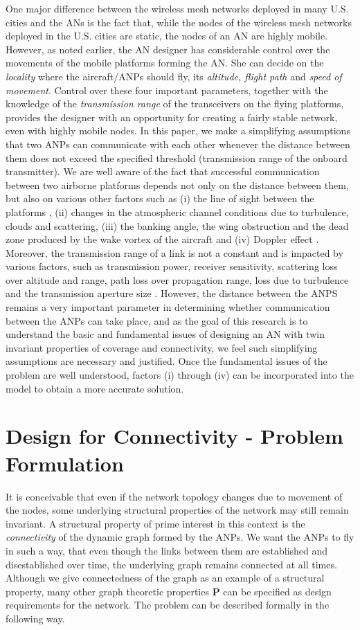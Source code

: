 \documentclass[10pt]{IEEEtran}
\begin{document}
One major difference between the wireless mesh networks deployed in many U.S. cities \cite{Wifi08} and the ANs is the fact that, while the nodes of the wireless mesh networks deployed in the U.S.
cities are static, the nodes of an AN are highly mobile. However, as noted earlier, the AN designer has considerable control over the movements of the mobile platforms forming the AN. She can decide on the {\em locality} where the aircraft/ANPs should fly, its {\em altitude, flight path} and {\em speed of movement}. Control over these four important parameters, together with the knowledge of the {\em transmission range} of the transceivers on the flying platforms, provides the designer with an opportunity for creating a fairly stable network, even with highly mobile nodes. In this paper, we make a simplifying assumptions that two ANPs can communicate with each other whenever the distance between them does not exceed the specified threshold (transmission range of the onboard transmitter).  We are well aware of the fact that successful communication between two airborne platforms depends not only on the distance between them, but also on various other factors such as (i) the line of sight between the platforms \cite{TIW08}, (ii) changes in the atmospheric channel conditions due to turbulence, clouds and scattering, (iii) the  banking angle,  the wing obstruction and the dead zone  produced by the wake vortex of the aircraft \cite{EPS04} and (iv) Doppler effect \cite{Doppler} . Moreover, the transmission range of a link is not a constant and is impacted by various factors, such as transmission power, receiver sensitivity, scattering loss over altitude and range, path loss over propagation range, loss due to turbulence and the transmission aperture size \cite{EPS04}. However, the distance between the ANPS remains a very important parameter in determining whether communication between the ANPs can take place, and as the goal of this research is to understand the basic and fundamental issues of designing an AN with twin invariant properties of coverage and connectivity, we feel such simplifying assumptions are necessary and justified. Once the fundamental issues of the problem are well understood, factors (i) through (iv) can be incorporated into the model to obtain a more accurate solution.

\section{Design for Connectivity - Problem Formulation}
\label{sec:probFormulation}
It is conceivable that even if the network topology changes due to movement of the nodes, some underlying structural properties of the network may still remain invariant.
A structural property of prime interest in this context is the {\em connectivity} of the dynamic graph formed by the ANPs. We want the ANPs to fly in such a way, that even though the links between them are established and disestablished over time, the underlying graph remains connected at all times. Although we give connectedness of the graph as an example of a structural property, many other graph theoretic properties $\mathbf{P}$ can be specified as design requirements for the network. The problem can be described formally in the following way.
\end{document}
